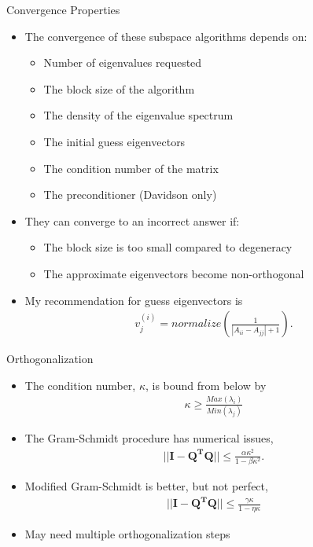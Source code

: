 \documentclass[10pt]{beamer}
\begin{document}
{{{{{{{{{{{%
\begin{frame}{Convergence Properties}
	\begin{itemize}[<+->]
		\item{The convergence of these subspace algorithms depends on:}
		\begin{itemize}
			\item{\alert{Number of eigenvalues} requested}
			\item{The \alert{block size} of the algorithm}
			\item{The \alert{density} of the eigenvalue spectrum}
			\item{The \alert{initial guess} eigenvectors}
			\item{The \alert{condition number} of the matrix}
			\item{The \alert{preconditioner} (Davidson only)}
		\end{itemize}
		\item{They can \alert{converge to an incorrect answer} if:}
		\begin{itemize}
			\item{The block size is too small compared to degeneracy}
			\item{The approximate eigenvectors become non-orthogonal}
		\end{itemize}
		\item{My recommendation for guess eigenvectors is
		\begin{eqnarray}
			v_j^{(i)} = normalize\left(\frac{1}{|A_{ii} - A_{jj}| + 1} \right).
		\end{eqnarray}
		}
	\end{itemize}
\end{frame}


{%
\begin{frame}{Orthogonalization}
	\begin{itemize}
		\item{The condition number, $\kappa$, is bound from below by
			\begin{eqnarray}
				\kappa \geq \frac{Max(\lambda_i)}{Min(\lambda_j)}
			\end{eqnarray}
		}
		\item{The Gram-Schmidt procedure has numerical issues, 
			\begin{eqnarray}
				||\mathbf{I} - \mathbf{Q^TQ}|| \leq \frac{\alpha\kappa^2}{1-\beta\kappa^2}.	
			\end{eqnarray}
		}
		\item{Modified Gram-Schmidt is better, but not perfect,
			\begin{eqnarray}
				||\mathbf{I} - \mathbf{Q^TQ}|| \leq \frac{\gamma\kappa}{1-\eta\kappa}	
			\end{eqnarray}
		}
		\item{May need multiple orthogonalization steps}
	\end{itemize}


\end{frame}}}}}}}}}}}}}
\end{document}
